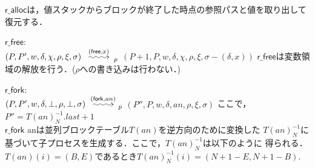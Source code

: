 \documentclass[submit,PRO]{ipsj}
\makeatletter
\newcommand{\longsquiggly}{\xymatrix{{}\ar@{~>}[r]&{}}}
\newcommand{\bcode}[1]{$\mathsf{#1}$}
\newcommand{\brightarrow}[1]{\stackrel{#1}{\longsquiggly}}
\makeatother
\begin{document}
\begin{list}
\bcode{r\_alloc}は，値スタックからブロックが終了した時点の参照パスと値を取り出して復元する．
\item \bcode{r\_free}:\\
$(P,P',w,\delta,\chi,\rho,\xi,\sigma)\brightarrow{(\mathsf{free},x)}_p$\newline
\qquad $(P+1,P,w,\delta,\chi,\rho,\xi,\sigma-(\delta,x))$\newline
\bcode{r\_free}は変数領域の解放を行う．($\rho$への書き込みは行わない．)
\item \bcode{r\_fork}:\\
$(P,P',w,\delta,\bot,\rho,\bot,\sigma)\brightarrow{(\mathsf{fork},an)}_p$\newline
\qquad $(P'',P,w,\delta,an,\rho,\xi,\sigma)$\newline
ここで，$P''=T(an)^{-1}_N.last+1$\\
\bcode{r\_fork} anは並列ブロックテーブル$T(an)$を逆方向のために変換した
$T(an)^{-1}_N$に基づいて子プロセスを生成する．ここで，$T(an)^{-1}_N$は以下のように
得られる．
$T(an)(i)=(B,E)$であるとき$T(an)^{-1}_N(i)=(N+1-E,N+1-B)$.

\end{list}
\end{document}
